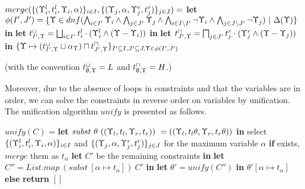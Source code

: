 {{{{\begin{algorithmic}
\STATE $merge(\{({\Upsilon_i^l},{t_i^l},{\Upsilon_i},{\alpha})\}_{i\in I},\{({\Upsilon_j},{\alpha},{\Upsilon_j^r},{t_j^r})\}_{j\in J})=$
\STATE \quad \textbf{let} $\phi(I',J') = \{\Upsilon\in dnf(\bigwedge_{i \in I'} \Upsilon_i \wedge \bigwedge_{j\in J'}\Upsilon_j\wedge \bigwedge_{i \in I\setminus I'} \neg \Upsilon_i \wedge \bigwedge_{j\in J\setminus J'}\neg \Upsilon_j) ~|~ \Delta(\Upsilon)\}$ \textbf{in}
\STATE  \quad \textbf{let} $t_{I',\Upsilon}^{\sqcup} =\bigsqcup_{i\in I'} t_i^l\cdot(\Upsilon_i^l\wedge (\Upsilon-\Upsilon_i))$ \textbf{in}
\STATE  \quad \textbf{let} $t_{J',\Upsilon}^{\sqcap} =\bigsqcap_{j\in J'} t_j^r\cdot(\Upsilon_j^r\wedge (\Upsilon-\Upsilon_j))$ \textbf{in}
\STATE  \quad $\{\Upsilon \mapsto (t_{I',\Upsilon}^{\sqcup} \sqcup \alpha_{\Upsilon})\sqcap t_{J',\Upsilon}^{\sqcap} \}_{I'\subseteq I, J'\subseteq J, \Upsilon \in \phi(I',J')}$
\end{algorithmic}
(with the convention $t_{\emptyset,\Upsilon}^{\sqcup} = L$ and $t_{\emptyset,\Upsilon}^{\sqcap} = H$.)
}

Moreover, due to the absence of  loops in constraints and that the variables are in order, we can solve the constraints in reverse order on variables by unification. The unification algorithm $unify$ is presented as follows.
{\myeqsize
\begin{algorithmic}
\STATE $unify(C)$ =
\STATE \quad \textbf{let} $subst ~\theta~(({\Upsilon_l},{t_l},{\Upsilon_r},{t_r}))~ = (({\Upsilon_l},{t_l\theta},{\Upsilon_r},{t_r\theta}))$ \textbf{in}
\STATE \quad select $\{({\Upsilon_i^l},{t_i^l},{\Upsilon_i},{\alpha})\}_{i\in I}$ and $\{({\Upsilon_j},{\alpha},{\Upsilon_j^r},{t_j^r})\}_{j\in J}$ for the maximum variable $\alpha$ \textbf{if} exists, $merge$ them as $t_{\alpha}$
\STATE \quad\quad \textbf{let} $C'$ be the remaining constraints \textbf{in} 
\STATE \quad\quad \textbf{let} $C'' = List.map~ (subst~[\alpha \mapsto t_{\alpha}])~ C'$ \textbf{in} 
\STATE \quad\quad \textbf{let} $\theta' = unify(C'')$ \textbf{in} $\theta'[\alpha \mapsto t_{\alpha}]$
\STATE \quad \textbf{else} \textbf{return} $[]$
\end{algorithmic}
}

}}}
